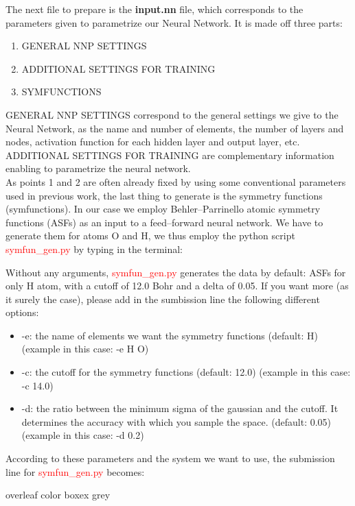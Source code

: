 \documentclass[12pt]{article}
\begin{document}
The next file to prepare is the \textbf{input.nn} file, which corresponds to the parameters given to parametrize our Neural Network. It is made off three parts:
\begin{enumerate}
    \item GENERAL NNP SETTINGS
    \item ADDITIONAL SETTINGS FOR TRAINING
    \item SYMFUNCTIONS
\end{enumerate}
GENERAL NNP SETTINGS correspond to the general settings we give to the Neural Network, as the name and number of elements, the number of layers and nodes, activation function for each hidden layer and output layer, etc. \\
ADDITIONAL SETTINGS FOR TRAINING are complementary information enabling to parametrize the neural network. \\
As points 1 and 2 are often already fixed by using some conventional parameters used in previous work, the last thing to generate is the symmetry functions (symfunctions). In our case we employ Behler--Parrinello atomic symmetry functions (ASFs) as an input to a feed--forward neural network. We have to generate them for atoms O and H, we thus employ the python script \textcolor{red}{symfun\_gen.py} by typing in the terminal:
\begin{center}
\end{center}
Without any arguments, \textcolor{red}{symfun\_gen.py} generates the data by default: ASFs for only H atom, with a cutoff of 12.0 Bohr and a delta of 0.05. If you want more (as it surely the case), please add in the sumbission line the following different options:
\begin{itemize}
    \item -e: the name of elements we want the symmetry functions (default: H) (example in this case: -e H O)
    \item -c: the cutoff for the symmetry functions (default: 12.0) (example in this case: -c 14.0)
    \item -d: the ratio between the minimum sigma of the gaussian and the cutoff. It determines the accuracy with which you sample the space. (default: 0.05) (example in this case: -d 0.2)
\end{itemize}
According to these parameters and the system we want to use, the submission line for \textcolor{red}{symfun\_gen.py} becomes:
\begin{center}
overleaf color boxex grey 
\end{center}
\end{document}
